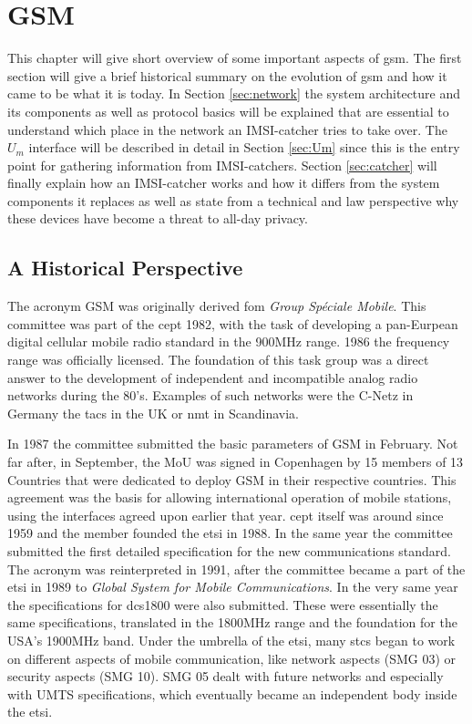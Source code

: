 \chapter{GSM}
\label{ch:gsm}
This chapter will give short overview of some important aspects of \gls{gsm}.
The first section will give a brief historical summary on the evolution of \gls{gsm} and how it came to be what it is today.
In Section \ref{sec:network} the system architecture and its components as well as protocol basics will be explained that are essential to understand which place in the network an IMSI-catcher tries to take over.
The $U_m$ interface will be described in detail in Section \ref{sec:Um} since this is the entry point for gathering information from IMSI-catchers.
Section \ref{sec:catcher} will finally explain how an IMSI-catcher works and how it differs from the system components it replaces as well as state from a technical and law perspective why these devices have become a threat to all-day privacy. 
 
\section{A Historical Perspective}
The acronym GSM was originally derived fom \emph{Group Sp\'{e}ciale Mobile}.
This committee was part of the \gls{cept} 1982, with the task of developing a pan-Eurpean digital cellular mobile radio standard in the 900MHz range.
1986 the frequency range was officially licensed.
The foundation of this task group was a direct answer to the development of independent and incompatible analog radio networks during the 80's.
Examples of such networks were the C-Netz in Germany the \gls{tacs} in the UK or \gls{nmt} in Scandinavia.

In 1987 the committee submitted the basic parameters of GSM in February. 
Not far after, in September, the \gls{MoU} was signed in Copenhagen by 15 members of 13 Countries that were dedicated to deploy GSM in their respective countries.
This agreement was the basis for allowing international operation of mobile stations, using the interfaces agreed upon earlier that year.
\gls{cept} itself was around since 1959 and the member founded the \gls{etsi} in 1988.
In the same year the committee submitted the first detailed specification for the new communications standard.
The acronym was reinterpreted in 1991, after the committee became a part of the \gls{etsi} in 1989 to \emph{Global System for Mobile Communications}.
In the very same year the specifications for \gls{dcs1800} were also submitted.
These were essentially the same specifications, translated in the 1800MHz range and the foundation for the USA's 1900MHz band.
Under the umbrella of the \gls{etsi}, many \glspl{stc} began to work on different aspects of mobile communication, like network aspects (SMG 03) or security aspects (SMG 10).
SMG 05 dealt with future networks and especially with UMTS specifications, which eventually became an independent body inside the \gls{etsi}.

